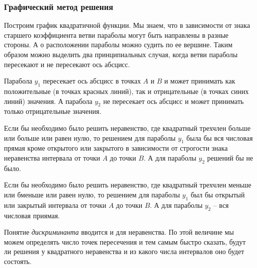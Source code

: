 \documentclass[algebra,twocolumn]{pum}
\begin{document}
\subsubsection*{Графический метод решения}
Построим график квадратичной функции. Мы знаем, что в зависимости от знака старшего коэффициента ветви параболы могут быть направлены в разные стороны. А о расположении параболы можно судить по ее вершине. Таким образом можно выделить два принципиальных случая, когда ветви параболы пересекают и не пересекают ось абсцисс. 


Парабола $y_1$ пересекает ось абсцисс в точках $A$ и $B$ и может принимать как положительные (в точках красных линий), так и отрицательные (в точках синих линий) значения. А парабола $y_2$ не пересекает ось абсцисс и может принимать только отрицательные значения.

Если бы необходимо было решить неравенство, где квадратный трехчлен больше или больше или равен нулю, то решением для параболы $y_1$ была бы вся числовая прямая кроме открытого или закрытого в зависимости от строгости знака неравенства интервала от точки $A$ до точки $B$. А для параболы $y_2$ решений бы не было.

Если бы необходимо было решить неравенство, где квадратный трехчлен меньше или бменьше или равен нулю, то решением для параболы $y_1$ был бы  открытый или закрытый интервала от точки $A$ до точки $B$. А для параболы $y_2$ -- вся числовая приямая.

Понятие \emph{дискриминанта} вводится и для неравенства. По этой величине мы можем определять число точек пересечения и тем самым быстро сказать, будут ли решения у квадратного неравенства и из какого числа интервалов оно будет состоять.
\end{document}
